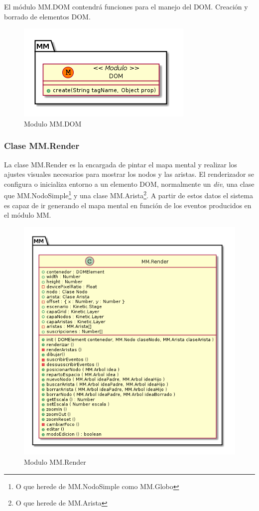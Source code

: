El módulo MM.DOM contendrá funciones para el manejo del DOM. Creación y borrado de elementos DOM. 

\begin{figure}[tbph]
\centering
\includegraphics[width=0.4\linewidth]{imagenes/diagrama-clase-mm-dom}
\caption{Modulo MM.DOM}

\label{fig:diagrama-clase-mm-dom}
\end{figure}



\subsubsection{Clase MM.Render}

La clase MM.Render es la encargada de pintar el mapa mental y realizar los ajustes visuales necesarios para mostrar los nodos y las aristas. El renderizador se configura o inicializa entorno a un elemento DOM, normalmente un \textit{div}, una clase que MM.NodoSimple\footnote{O que herede de MM.NodoSimple como MM.Globo} y una clase MM.Arista\footnote{O que herede de MM.Arista}. A partir de estos datos el sistema es capaz de ir generando el mapa mental en función de los eventos producidos en el módulo MM. 

\begin{figure}[tbph]
\centering
\includegraphics[width=0.65\linewidth]{imagenes/diagrama-clase-mm-render}
\caption{Modulo MM.Render}

\label{fig:diagrama-clase-mm-render}
\end{figure}

